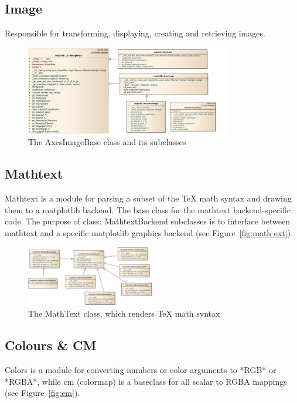 \documentclass[pdftex,10pt,a4paper]{report}
\begin{document}
\subsection{Image}
Responsible for transforming, displaying, creating and retrieving images.
\begin{figure}[ht!]
        \centering
                \includegraphics[width=0.8\textwidth]{img/umls/josh/img}
        \caption{The AxesImageBase class and its subclasses}\label{fig:math text}
\end{figure}


\subsection{Mathtext}

Mathtext is a module for parsing a subset of the TeX math syntax and drawing them to a matplotlib backend. The base class for the mathtext backend-specific code.  The purpose of class: MathtextBackend subclasses is to interface between mathtext and a specific matplotlib graphics backend (see Figure~\ref{fig:math ext}).

\begin{figure}[ht!]
        \centering
                \includegraphics[width=0.5\textwidth]{img/umls/kevin/mathtext}
        \caption{The MathText class, which renders TeX math syntax}\label{fig:math text}
\end{figure}


\subsection{Colours \& CM}
Colors is a module for converting numbers or color arguments to *RGB* or *RGBA*, while cm (colormap) is a baseclass for all scalar to RGBA mappings (see Figure~\ref{fig:cm}).
\end{document}
